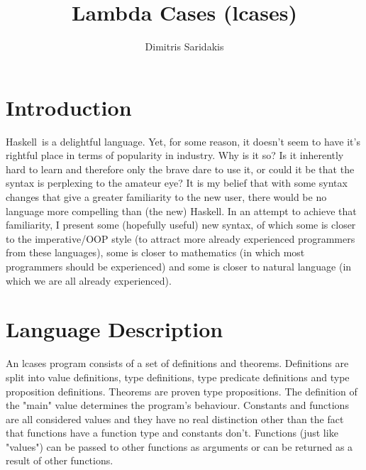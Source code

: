 \documentclass{article}
\date{}
\author{
  Dimitris Saridakis
}
\def\H{Haskell}
\begin{document}
\title{
\textbf{Lambda Cases (lcases)}
}
\maketitle

\tableofcontents

\section{Introduction}

\H\ is a delightful language. Yet, for some reason, it doesn't seem to have
it's rightful place in terms of popularity in industry. Why is it so?  Is it
inherently hard to learn and therefore only the brave dare to use it, or could
it be that the syntax is perplexing to the amateur eye? It is my belief that
with some syntax changes that give a greater familiarity to the new user, there
would be no language more compelling than (the new) \H. In an attempt to
achieve that familiarity, I present some (hopefully useful) new syntax, of
which some is closer to the imperative/OOP style (to attract more already
experienced programmers from these languages), some is closer to mathematics
(in which most programmers should be experienced) and some is closer to natural
language (in which we are all already experienced). 

\section{Language Description}

An lcases program consists of a set of definitions and theorems.  Definitions
are split into value definitions, type definitions, type predicate definitions
and type proposition definitions. Theorems are proven type propositions.  The
definition of the "main" value determines the program's behaviour.  Constants
and functions are all considered values and they have no real distinction other
than the fact that functions have a function type and constants don't.
Functions (just like "values") can be passed to other functions as arguments or
can be returned as a result of other functions. 
\end{document}
